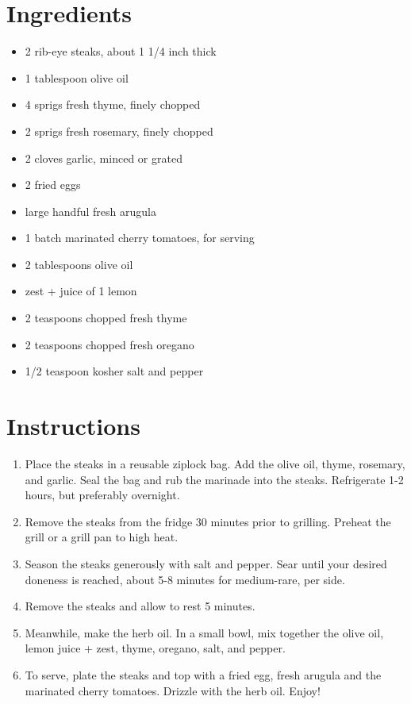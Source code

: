 \documentclass[
  letterpaper,
  DIV=11,
  numbers=noendperiod,
  titlepage=false]{scrreprt}
\providecommand{\tightlist}{%
  \setlength{\itemsep}{0pt}\setlength{\parskip}{0pt}}\usepackage{longtable,booktabs,array}
\begin{document}
\section{Ingredients}\label{ingredients-104}

\begin{itemize}
\tightlist
\item
  2 rib-eye steaks, about 1 1/4 inch thick
\item
  1 tablespoon olive oil
\item
  4 sprigs fresh thyme, finely chopped
\item
  2 sprigs fresh rosemary, finely chopped
\item
  2 cloves garlic, minced or grated
\item
  2 fried eggs
\item
  large handful fresh arugula
\item
  1 batch marinated cherry tomatoes, for serving
\item
  2 tablespoons olive oil
\item
  zest + juice of 1 lemon
\item
  2 teaspoons chopped fresh thyme
\item
  2 teaspoons chopped fresh oregano
\item
  1/2 teaspoon kosher salt and pepper
\end{itemize}

\section{Instructions}\label{instructions-104}

\begin{enumerate}
\def\labelenumi{\arabic{enumi}.}
\tightlist
\item
  Place the steaks in a reusable ziplock bag. Add the olive oil, thyme,
  rosemary, and garlic. Seal the bag and rub the marinade into the
  steaks. Refrigerate 1-2 hours, but preferably overnight.
\item
  Remove the steaks from the fridge 30 minutes prior to grilling.
  Preheat the grill or a grill pan to high heat.
\item
  Season the steaks generously with salt and pepper. Sear until your
  desired doneness is reached, about 5-8 minutes for medium-rare, per
  side.
\item
  Remove the steaks and allow to rest 5 minutes.
\item
  Meanwhile, make the herb oil. In a small bowl, mix together the olive
  oil, lemon juice + zest, thyme, oregano, salt, and pepper.
\item
  To serve, plate the steaks and top with a fried egg, fresh arugula and
  the marinated cherry tomatoes. Drizzle with the herb oil. Enjoy!
\end{enumerate}
\end{document}
